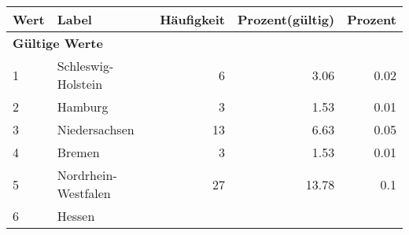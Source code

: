      \begin{longtable}{lXrrr}
     \toprule
     \textbf{Wert} & \textbf{Label} & \textbf{Häufigkeit} & \textbf{Prozent(gültig)} & \textbf{Prozent} \\
     \endhead
     \midrule
     \multicolumn{5}{l}{\textbf{Gültige Werte}}\\

     1 &
     \multicolumn{1}{X}{ Schleswig-Holstein   } &


       \num{6} &
       \num[round-mode=places,round-precision=2]{3.06} &
         \num[round-mode=places,round-precision=2]{0.02} \\

     2 &
     \multicolumn{1}{X}{ Hamburg   } &


       \num{3} &
       \num[round-mode=places,round-precision=2]{1.53} &
         \num[round-mode=places,round-precision=2]{0.01} \\

     3 &
     \multicolumn{1}{X}{ Niedersachsen   } &


       \num{13} &
       \num[round-mode=places,round-precision=2]{6.63} &
         \num[round-mode=places,round-precision=2]{0.05} \\

     4 &
     \multicolumn{1}{X}{ Bremen   } &


       \num{3} &
       \num[round-mode=places,round-precision=2]{1.53} &
         \num[round-mode=places,round-precision=2]{0.01} \\

     5 &
     \multicolumn{1}{X}{ Nordrhein-Westfalen   } &


       \num{27} &
       \num[round-mode=places,round-precision=2]{13.78} &
         \num[round-mode=places,round-precision=2]{0.1} \\

     6 &
     \multicolumn{1}{X}{ Hessen   } &



\end{longtable}
